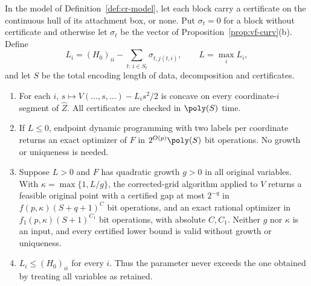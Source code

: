 \begin{theorem}\label{thm:cr}
In the model of Definition~\ref{def:cr-model}, let each block carry a
certificate on the continuous hull of its attachment box, or none. Put
$\sigma_t=0$ for a block without certificate and otherwise let $\sigma_t$ be
the vector of Proposition~\ref{prop:vf-curv}(b). Define
\begin{equation}\label{eq:cr-L}
L_i=(H_0)_{ii}-\sum_{t:\,i\in S_t}\sigma_{t,j(t,i)},\qquad L=\max_iL_i,
\end{equation}
and let $S$ be the total encoding length of data, decomposition and
certificates.
\begin{enumerate}
\item[(i)] For each $i$, $s\mapsto V(\ldots,s,\ldots)-L_is^2/2$ is concave on
every coordinate-$i$ segment of $\widehat Z$. All certificates are checked in
$\poly(S)$ time.
\item[(ii)] If $L\le0$, endpoint dynamic programming with two labels per
coordinate returns an exact optimizer of $F$ in $2^{O(p)}\poly(S)$ bit
operations. No growth or uniqueness is needed.
\item[(iii)] Suppose $L>0$ and $F$ has quadratic growth $g>0$ in all original
variables. With $\kappa=\max\{1,L/g\}$, the corrected-grid algorithm applied to
$V$ returns a feasible original point with a certified gap at most $2^{-q}$ in
$f(p,\kappa)(S+q+1)^C$ bit operations, and an exact rational optimizer in
$f_1(p,\kappa)(S+1)^{C_1}$ bit operations, with absolute $C,C_1$. Neither $g$
nor $\kappa$ is an input, and every certified lower bound is valid without
growth or uniqueness.
\item[(iv)] $L_i\le(H_0)_{ii}$ for every $i$. Thus the parameter never exceeds
the one obtained by treating all variables as retained.
\end{enumerate}
\end{theorem}

